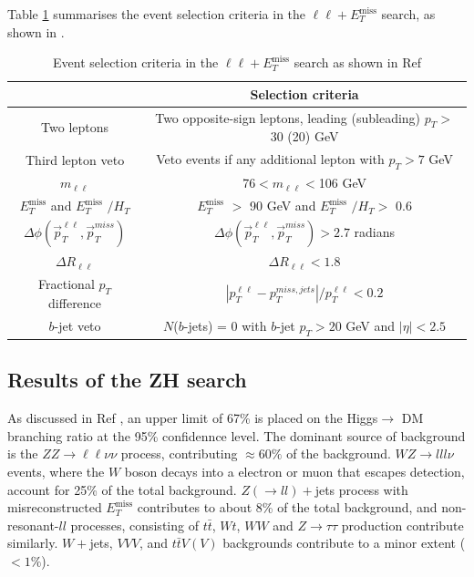 \documentclass[11pt,a4paper,openright,twoside]{report}
\newcommand{\ZZ}{$ZZ\to \ell\ell\nu\nu$ }
\newcommand{\met}{$E_T^{\mathrm{miss}}$ }
\begin{document}
Table \ref{table:event_selection} summarises the event selection criteria in the $\ell\ell+$\met search, as shown in \cite{ZH_ATLAS}.
{\renewcommand{\arraystretch}{1.5}
\begin{table}[H]
\centering
\begin{tabular}{c c}
\hline
\hline
& Selection criteria\\
\hline
Two leptons & Two opposite-sign leptons, leading (subleading) $p_T>$ 30 (20) GeV \\
\hline
Third lepton veto & Veto events if any additional lepton with $p_T>7$ GeV\\
\hline
$m_{\ell\ell}$ & 76$<m_{\ell\ell}<$106 GeV\\
\hline
\met and \met$/H_T$ & \met$>$ 90 GeV and \met$/H_T >$ 0.6\\
\hline
$\Delta\phi(\vec{p}_T^{\ell\ell},\vec{p}_T^{miss})$ & $\Delta\phi(\vec{p}_T^{\ell\ell},\vec{p}_T^{miss})>2.7$ radians\\
\hline
$\Delta R_{\ell\ell}$ & $\Delta R_{\ell\ell}<1.8$\\
\hline
Fractional $p_T$ difference & $\left| p_T^{\ell\ell} - p_T^{miss,jets}\right|/p_T^{\ell\ell}<0.2$\\
\hline
$b$-jet veto & $N$($b$-jets) = 0 with $b$-jet $p_T>20$ GeV and $|\eta|<2.5$\\
\hline
\hline
\end{tabular}
\caption{Event selection criteria in the $\ell\ell+$\met search as shown in Ref \cite{ZH_ATLAS}}
\label{table:event_selection}
\end{table}
}
\subsection{Results of the ZH search}
As discussed in Ref \cite{ZH_ATLAS}, an upper limit of 67\% is placed on the Higgs$\to$ DM branching ratio at the 95\% confidennce level. The dominant source of background is the \ZZ process, contributing $\approx 60\%$ of the background. $WZ\to lll\nu$ events, where the $W$ boson decays into a electron or muon that escapes detection, account for 25\% of the total background. $Z(\to ll)+$jets process with misreconstructed \met contributes to about 8\% of the total background, and non-resonant-$ll$ processes, consisting of $t\bar{t}$, $Wt$, $WW$ and $Z\to\tau\tau$ production contribute similarly. $W+$jets, $VVV$, and $t\bar{t}V(V)$ backgrounds contribute to a minor extent ($<1\%$).
\end{document}
